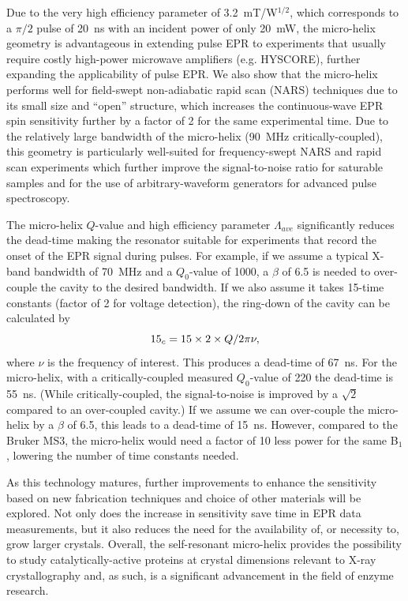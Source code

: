 Due to the very high efficiency parameter of 3.2~mT/W$^{1/2}$, which corresponds to a $\pi/2$ pulse of 20~ns with an incident power of only 20~mW, the micro-helix geometry is advantageous in extending pulse EPR to experiments that usually require costly high-power microwave amplifiers (e.g. HYSCORE), further expanding the applicability of pulse EPR. We also show that the micro-helix performs well for field-swept non-adiabatic rapid scan (NARS) techniques due to its small size and ``open'' structure, which increases the continuous-wave EPR spin sensitivity further by a factor of 2 for the same experimental time. Due to the relatively large bandwidth of the micro-helix (90~MHz critically-coupled), this geometry is particularly well-suited for frequency-swept NARS and rapid scan experiments which further improve the signal-to-noise ratio for saturable samples\cite{Hyde2013MDIFF, MOSER2017} and for the use of arbitrary-waveform generators for advanced pulse spectroscopy. \cite{schweiger2001principles, chirpedESEEM, goldfarb2018epr}

The micro-helix $Q$-value and high efficiency parameter $\Lambda_{ave}$ significantly reduces the dead-time making the resonator suitable for experiments that record the onset of the EPR signal during pulses. For example, if we assume a typical X-band bandwidth of 70~MHz and a $Q_0$-value of 1000, a $\beta$ of 6.5 is needed to over-couple the cavity to the desired bandwidth. If we also assume it takes 15-time constants (factor of 2 for voltage detection), the ring-down of the cavity can be calculated by
\begin{equation}
    15 \time \tau_c = 15 \times 2 \times Q / 2 \pi \nu,
\end{equation}
where $\nu$ is the frequency of interest. This produces a dead-time of 67~ns. For the micro-helix, with a critically-coupled measured $Q_0$-value of 220 the dead-time is 55~ns. (While critically-coupled, the signal-to-noise is improved by a $\sqrt{2}$ compared to an over-coupled cavity.) If we assume we can over-couple the micro-helix by a $\beta$ of 6.5, this leads to a dead-time of 15~ns. However, compared to the Bruker MS3, the micro-helix would need a factor of 10 less power for the same B$_1$, lowering the number of time constants needed.

As this technology matures, further improvements to enhance the sensitivity based on new fabrication techniques and choice of other materials will be explored. Not only does the increase in sensitivity save time in EPR data measurements, but it also reduces the need for the availability of, or necessity to, grow larger crystals. Overall, the self-resonant micro-helix provides the possibility to study catalytically-active proteins at crystal dimensions relevant to X-ray crystallography and, as such, is a significant advancement in the field of enzyme research. 

{\renewcommand{\bibsection}{\clearpage\section*{\bibname}\markboth{\bibname}{\bibname}}
\renewcommand{\bibname}{CHAPTER 5. REFERENCES}


}
